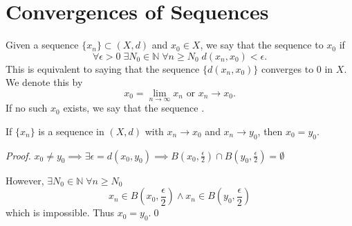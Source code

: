 \documentclass[notoc,notitlepage]{tufte-book}
\begin{document}

\section{Convergences of Sequences}%
\label{sec:convergences_of_sequences}

\begin{defn}[Convergence]\label{defn:convergence}
  Given a sequence $\{ x_n \} \subset (X, d)$ and $x_0 \in X$, we say that the sequence  to $x_0$ if
  \begin{equation*}
    \forall \epsilon > 0 \; \exists N_0 \in \mathbb{N} \; \forall n \geq N_0 \; d(x_n, x_0) < \epsilon.
  \end{equation*}
  This is equivalent to saying that the sequence $\{ d(x_n, x_0) \}$ converges to $0$ in $X$. We denote this by
  \begin{equation*}
    x_0 = \lim_{n \to \infty} x_n \text{ or } x_n \to x_0.
  \end{equation*}
  If no such $x_0$ exists, we say that the sequence .
\end{defn}

\begin{thm}\label{thm:uniqueness_of_limits_of_sequences}
  If $\{ x_n \}$ is a sequence in $(X, d)$ with $x_n \to x_0$ and $x_n \to y_0$, then $x_0 = y_0$.
\end{thm}

\begin{proof}
  $x_0 \neq y_0 \implies \exists \epsilon = d(x_0, y_0) \implies B\left(x_0, \frac{\epsilon}{2}\right) \cap B\left(y_0, \frac{\epsilon}{2}\right) = \emptyset$
  \begin{marginfigure}
    \centering
    \caption{A geometric representation of the proof for \cref{thm:uniqueness_of_limits_of_sequences}.}\label{fig:a_geometric_representation_of_the_proof_for_uniqueness_of_limits_of_sequences}
  \end{marginfigure}

  However, $\exists N_0 \in \mathbb{N} \; \forall n \geq N_0$ \\
  \begin{equation*}
    x_n \in B\left(x_0, \frac{\epsilon}{2}\right) \land x_n \in B\left(y_0, \frac{\epsilon}{2}\right)
  \end{equation*}
  which is impossible. Thus $x_0 = y_0$.\qed\
\end{proof}
\end{document}
